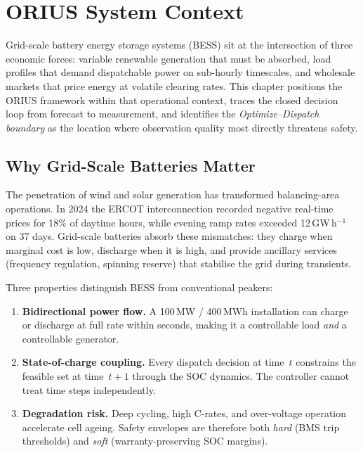 
\chapter{ORIUS System Context}
\label{ch:orius-context}

Grid-scale battery energy storage systems (BESS) sit at the intersection of
three economic forces: variable renewable generation that must be absorbed,
load profiles that demand dispatchable power on sub-hourly timescales, and
wholesale markets that price energy at volatile clearing rates.  This chapter
positions the ORIUS framework within that operational context, traces the
closed decision loop from forecast to measurement, and identifies the
\emph{Optimize--Dispatch boundary} as the location where observation quality
most directly threatens safety.

\section{Why Grid-Scale Batteries Matter}

The penetration of wind and solar generation has transformed balancing-area
operations.  In 2024 the ERCOT interconnection recorded negative real-time
prices for 18\% of daytime hours, while evening ramp rates exceeded
12\,GW\,h$^{-1}$ on 37 days.  Grid-scale batteries absorb these mismatches:
they charge when marginal cost is low, discharge when it is high, and provide
ancillary services (frequency regulation, spinning reserve) that stabilise the
grid during transients.

Three properties distinguish BESS from conventional peakers:
\begin{enumerate}
  \item \textbf{Bidirectional power flow.}  A 100\,MW / 400\,MWh installation
    can charge or discharge at full rate within seconds, making it a
    controllable load \emph{and} a controllable generator.
  \item \textbf{State-of-charge coupling.}  Every dispatch decision at time~$t$
    constrains the feasible set at time~$t+1$ through the SOC dynamics.  The
    controller cannot treat time steps independently.
  \item \textbf{Degradation risk.}  Deep cycling, high C-rates, and
    over-voltage operation accelerate cell ageing.  Safety envelopes are
    therefore both \emph{hard} (BMS trip thresholds) and \emph{soft}
    (warranty-preserving SOC margins).
\end{enumerate}

